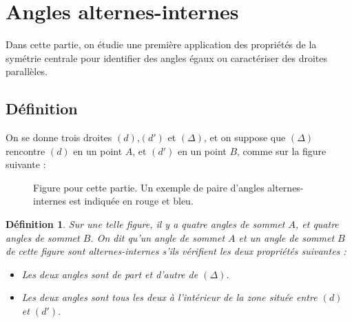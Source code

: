 \documentclass[12 pt]{article}
\theoremstyle{plain}
\newcounter{n}
\numberwithin{n}{section}
\newtheorem*{df}{Définition}
\begin{document}
\section{Angles alternes-internes}
Dans cette partie, on étudie une première application des propriétés de la symétrie centrale pour identifier 
des angles égaux ou caractériser des droites parallèles. 
\subsection{Définition}

On se donne trois droites $(d)$,$(d')$ et $(\Delta)$, et on suppose que $(\Delta)$ rencontre $(d)$ en un point $A$,
et $(d')$ en un point $B$, comme sur la figure suivante : 
\begin{figure}[H]\center
{}

 \caption{Figure pour cette partie. Un exemple de paire d'angles alternes-internes est indiquée en rouge et bleu.}
\end{figure}
\begin{df}Sur une telle figure, il y a quatre angles de sommet $A$, et quatre angles de sommet $B$. 
On dit qu'un angle de sommet $A$ et un angle de sommet $B$ de cette figure sont \emph{alternes-internes} s'ils 
vérifient les deux propriétés suivantes : 
\begin{itemize}
\item Les deux angles sont de part et d'autre de $(\Delta)$.
\item Les deux angles sont tous les deux à l'intérieur de la zone située entre $(d)$ et $(d')$. 
\end{itemize}
\end{df}
\end{document}
